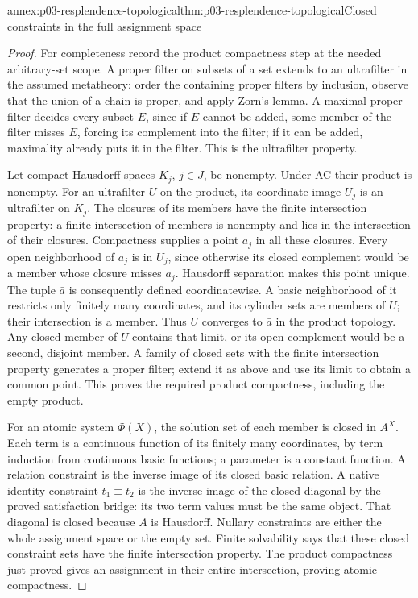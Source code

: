 \begin{annexitem}{annex:p03-resplendence-topological}{thm:p03-resplendence-topological}{Closed constraints in the full assignment space}
\begin{proof}
For completeness record the product compactness step at the needed
arbitrary-set scope. A proper filter on subsets of a set extends to an
ultrafilter in the assumed metatheory: order the containing proper filters
by inclusion, observe that the union of a chain is proper, and apply Zorn's
lemma. A maximal proper filter decides every subset \(E\), since if
\(E\) cannot be added, some member of the filter misses \(E\), forcing
its complement into the filter; if it can be added, maximality already
puts it in the filter. This is the ultrafilter property.

Let compact Hausdorff spaces \(K_j\), \(j\in J\), be nonempty. Under
AC their product is nonempty. For an ultrafilter \(U\) on the product,
its coordinate image \(U_j\) is an ultrafilter on \(K_j\). The closures
of its members have the finite intersection property: a finite intersection
of members is nonempty and lies in the intersection of their closures.
Compactness supplies a point \(a_j\) in all these closures. Every open
neighborhood of \(a_j\) is in \(U_j\), since otherwise its closed
complement would be a member whose closure misses \(a_j\).
Hausdorff separation makes this point unique. The tuple \(\bar a\)
is consequently defined coordinatewise. A basic neighborhood of it restricts
only finitely many coordinates, and its cylinder sets are members of
\(U\); their intersection is a member. Thus \(U\) converges to
\(\bar a\) in the product topology. Any closed member of \(U\)
contains that limit, or its open complement would be a second, disjoint
member. A family of closed sets with the finite intersection property
generates a proper filter; extend it as above and use its limit to obtain
a common point. This proves the required product compactness, including
the empty product.

For an atomic system \(\Phi(X)\), the solution set of each member is
closed in \(A^X\). Each term is a continuous function of its finitely
many coordinates, by term induction from continuous basic functions;
a parameter is a constant function. A relation constraint is the inverse
image of its closed basic relation. A native identity constraint
\(t_1\equiv t_2\) is the inverse image of the closed diagonal by the
proved satisfaction bridge: its two term values must be the same object.
That diagonal is closed because \(A\) is Hausdorff.
Nullary constraints are either the whole assignment space or the empty
set. Finite solvability says that these closed constraint sets have the
finite intersection property. The product compactness just proved gives
an assignment in their entire intersection, proving atomic compactness.


\end{proof}
\end{annexitem}
